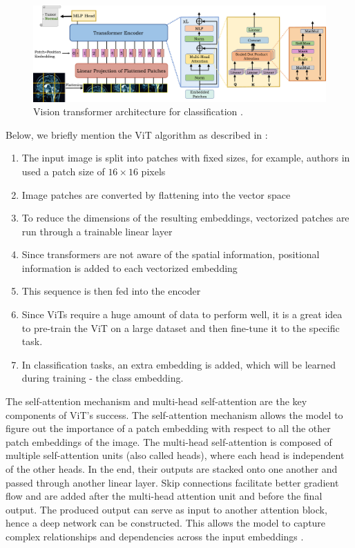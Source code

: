 \begin{figure}[H]
    \begin{centering}
    \includegraphics[width=14cm]{assets/images/vit.jpg}
    \par\end{centering}
    \caption{Vision transformer architecture for classification \cite{Shamshad2023}.}
    \label{fig:vit}
\end{figure}

Below, we briefly mention the ViT algorithm as described in \cite{Shamshad2023}:

\begin{enumerate}
    \item The input image is split into patches with fixed sizes, for example, authors in \cite{Dosovitskiy2020} used a patch size of $16\!\times\!16$ pixels
    \item Image patches are converted by flattening into the vector space
    \item To reduce the dimensions of the resulting embeddings, vectorized patches are run through a trainable linear layer
    \item Since transformers are not aware of the spatial information, positional information is added to each vectorized embedding
    \item This sequence is then fed into the encoder
    \item Since ViTs require a huge amount of data to perform well, it is a great idea to pre-train the ViT on a large dataset and then fine-tune it to the specific task.
    \item In classification tasks, an extra embedding is added, which will be learned during training - the class embedding.
\end{enumerate}

The self-attention mechanism and multi-head self-attention are the key components of ViT's success. The self-attention mechanism allows the model to figure out the importance of a patch embedding with respect to all the other patch embeddings of the image. The multi-head self-attention is composed of multiple self-attention units (also called heads), where each head is independent of the other heads. In the end, their outputs are stacked onto one another and passed through another linear layer. Skip connections facilitate better gradient flow and are added after the multi-head attention unit and before the final output. The produced output can serve as input to another attention block, hence a deep network can be constructed. This allows the model to capture complex relationships and dependencies across the input embeddings \cite{Shamshad2023}.

